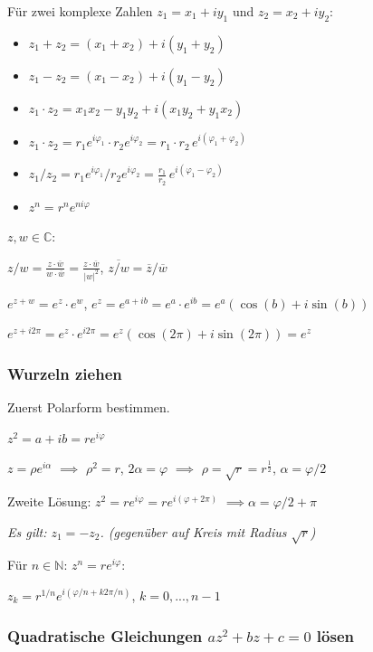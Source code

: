 Für zwei komplexe Zahlen $z_1 = x_1 + iy_1$ und $z_2 = x_2 + iy_2$:

\begin{itemize}
    \item $z_1 + z_2 = (x_1 + x_2) + i(y_1 + y_2)$
    \item $z_1 - z_2 = (x_1 - x_2) + i(y_1 - y_2)$
    \item $z_1 \cdot z_2 = x_1 x_2 - y_1 y_2 + i(x_1 y_2 + y_1 x_2)$
    \item $z_1 \cdot z_2 = r_1 e^{i\varphi_1} \cdot r_2 e^{i\varphi_2} = r_1 \cdot r_2 \, e^{i(\varphi_1 + \varphi_2)}$
    \item $z_1 / z_2 = r_1 e^{i\varphi_1} / r_2 e^{i\varphi_2} = \frac{r_1}{r_2} \, e^{i(\varphi_1 - \varphi_2)}$
    \item $z^n = r^n e^{ni\varphi}$
\end{itemize}

$z,w \in \mathbb{C}$:

$z/w = \frac{z \cdot \overline{w}}{w \cdot \overline{w}}=\frac{z \cdot \overline{w}}{|w|^2}$, 
$\overline{z/w}=\overline{z}/\overline{w}$

$e^{z+w} = e^z \cdot e^w$, $e^z = e^{a + ib} = e^{a} \cdot e^{ib} = e^a (\cos(b) + i \sin(b))$

$e^{z + i 2 \pi} = e^z \cdot e^{i 2 \pi} = e^z (\cos(2 \pi) + i \sin (2 \pi)) = e^z$


\subsubsection{Wurzeln ziehen}

Zuerst Polarform bestimmen.

 $z^2 = a+ib = r e^{i\varphi}$

$z=\rho e^{i \alpha}$
$\implies$ $\rho^2 = r$, $2\alpha = \varphi$ $\implies$ $\rho = \sqrt{r}=r^{\frac{1}{2}}$, $\alpha = \varphi / 2$

Zweite Lösung: 
$z^2 = re^{i\varphi} = re^{i(\varphi + 2 \pi)}$
$\implies \alpha = \varphi / 2+ \pi$

\textit{Es gilt: $z_1 = -z_2$. (gegenüber auf Kreis mit Radius $\sqrt{r}$)}

 Für $n \in \mathbb{N}$: $z^n = re^{i \varphi}$: 

 $z_k = r^{1/n} e^{i(\varphi / n + k2 \pi / n)}$, $k=0,..., n-1$

\subsubsection{Quadratische Gleichungen $az^2 + bz + c = 0$ lösen}

